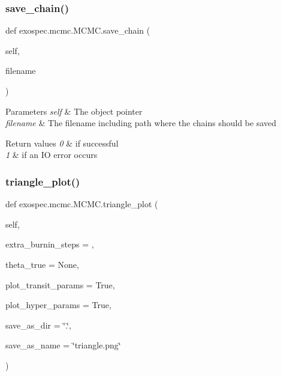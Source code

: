 \subsubsection{\texorpdfstring{save\+\_\+chain()}{save\_chain()}}
{\footnotesize\ttfamily def exospec.\+mcmc.\+M\+C\+M\+C.\+save\+\_\+chain (\begin{DoxyParamCaption}\item[{}]{self,  }\item[{}]{filename }\end{DoxyParamCaption})}


\begin{DoxyParams}{Parameters}
{\em self} & The object pointer \\
\hline
{\em filename} & The filename including path where the chains should be saved \\
\hline
\end{DoxyParams}

\begin{DoxyRetVals}{Return values}
{\em 0} & if successful \\
\hline
{\em 1} & if an IO error occurs \\
\hline
\end{DoxyRetVals}
\mbox{\label{classexospec_1_1mcmc_1_1_m_c_m_c_af240e8deac4470da704239926ea56822}} 
\subsubsection{\texorpdfstring{triangle\+\_\+plot()}{triangle\_plot()}}
{\footnotesize\ttfamily def exospec.\+mcmc.\+M\+C\+M\+C.\+triangle\+\_\+plot (\begin{DoxyParamCaption}\item[{}]{self,  }\item[{}]{extra\+\_\+burnin\+\_\+steps = {},  }\item[{}]{theta\+\_\+true = {\ttfamily None},  }\item[{}]{plot\+\_\+transit\+\_\+params = {\ttfamily True},  }\item[{}]{plot\+\_\+hyper\+\_\+params = {\ttfamily True},  }\item[{}]{save\+\_\+as\+\_\+dir = {\ttfamily \char`\"{}.\char`\"{}},  }\item[{}]{save\+\_\+as\+\_\+name = {\ttfamily \char`\"{}triangle.png\char`\"{}} }\end{DoxyParamCaption})}

